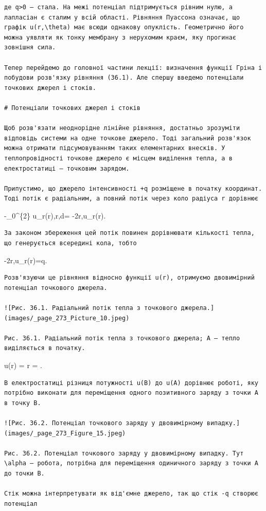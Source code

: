 \documentclass[
  ukrainian,
]{article}
\begin{document}
\begin{verbatim}
де q>0 — стала. На межі потенціал підтримується рівним нулю, а лапласіан є сталим у всій області. Рівняння Пуассона означає, що графік u(r,\theta) має всюди однакову опуклість. Геометрично його можна уявляти як тонку мембрану з нерухомим краєм, яку прогинає зовнішня сила.

Тепер перейдемо до головної частини лекції: визначення функції Гріна і побудови розв'язку рівняння (36.1). Але спершу введемо потенціали точкових джерел і стоків.

# Потенціали точкових джерел і стоків

Щоб розв'язати неоднорідне лінійне рівняння, достатньо зрозуміти відповідь системи на одне точкове джерело. Тоді загальний розв'язок можна отримати підсумовуванням таких елементарних внесків. У теплопровідності точкове джерело є місцем виділення тепла, а в електростатиці — точковим зарядом.

Припустимо, що джерело інтенсивності +q розміщене в початку координат. Тоді потік є радіальним, а повний потік через коло радіуса r дорівнює
\end{verbatim}

-\int\_0\^{}\{2\pi\} u\_r(r),r,d\theta = -2\pi r,u\_r(r).

\begin{verbatim}
За законом збереження цей потік повинен дорівнювати кількості тепла, що генерується всередині кола, тобто
\end{verbatim}

-2\pi r,u\_r(r)=q.

\begin{verbatim}
Розв'язуючи це рівняння відносно функції u(r), отримуємо двовимірний потенціал точкового джерела.

![Рис. 36.1. Радіальний потік тепла з точкового джерела.](images/_page_273_Picture_10.jpeg)

Рис. 36.1. Радіальний потік тепла з точкового джерела; A — тепло виділяється в початку.
\end{verbatim}

u(r) =  \ln r =  \ln {}.

\begin{verbatim}
В електростатиці різниця потужності u(B) до u(A) дорівнює роботі, яку потрібно виконати для переміщення одного позитивного заряду з точки A в точку B.

![Рис. 36.2. Потенціал точкового заряду у двовимірному випадку.](images/_page_273_Figure_15.jpeg)

Рис. 36.2. Потенціал точкового заряду у двовимірному випадку. Тут \alpha — робота, потрібна для переміщення одиничного заряду з точки A до точки B.

Стік можна інтерпретувати як від'ємне джерело, так що стік -q створює потенціал
\end{verbatim}
\end{document}
